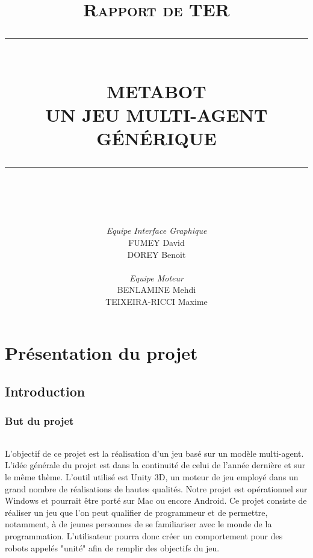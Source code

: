 \documentclass{report}
\newcommand{\HRule}[1]{\rule{\linewidth}{#1}}
\begin{document}
\title{\normalsize \textsc{Rapport de TER}
		\\ [1.5cm]
		\HRule{0.5pt} \\
		\LARGE \textbf{\uppercase{Metabot\\Un jeu multi-agent générique}}\\\HRule{0.5pt} \\}

\date{}

\author{
\textit{Equipe Interface Graphique} \\
		FUMEY David \\
	DOREY Benoit \\ \\
	\textit{Equipe Moteur} \\	
	BENLAMINE Mehdi \\
	TEIXEIRA-RICCI Maxime}

\maketitle
\paragraph{}
\newpage
 
\newpage
\tableofcontents
\newpage

\part{Présentation du projet}
\chapter{Introduction}
\section{But du projet}
\paragraph{}
L'objectif de ce projet est la réalisation d'un jeu basé sur un modèle multi-agent. L'idée générale du projet est dans la continuité de celui de l'année dernière et sur le même thème. L'outil utilisé est Unity 3D, un moteur de jeu employé dans un grand nombre de réalisations de hautes qualités. Notre projet est opérationnel sur Windows et pourrait être porté sur Mac ou encore Android.
Ce projet consiste de réaliser un jeu que l'on peut qualifier de programmeur et de permettre, notamment, à de jeunes personnes de se familiariser avec le monde de la programmation. L'utilisateur pourra donc créer un comportement pour des robots appelés "unité" afin de remplir des objectifs du jeu.
\end{document}
